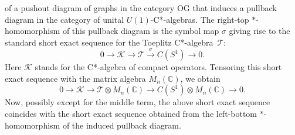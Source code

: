 \documentclass[12pt,times,a4paper]{amsart}
\numberwithin{equation}{section}
\numberwithin{equation}{section}
\begin{document}
of a pushout diagram of graphs in the category OG that induces a pullback diagram in the category of unital $U(1)$-C*-algebras.
The right-top $*$-homomorphism of this pullback diagram is the symbol map $\sigma$ giving rise to the standard
 short exact sequence for the Toeplitz C*-algebra~$\mathcal{T}$:
\begin{equation}
0\longrightarrow\mathcal{K}\longrightarrow\mathcal{T}\stackrel{\sigma}{\longrightarrow}C(S^1)\longrightarrow 0.
\end{equation}
Here $\mathcal{K}$ stands for the C*-algebra of compact operators. Tensoring this short exact sequence with the matrix algebra
$M_n(\mathbb{C})$, we obtain
\begin{equation}
0\longrightarrow\mathcal{K}\longrightarrow\mathcal{T}\otimes M_n(\mathbb{C})\stackrel{}{\longrightarrow}C(S^1)
\otimes M_n(\mathbb{C})\longrightarrow 0.
\end{equation}
Now, possibly except for the middle term, the above short exact sequence coincides with the short exact sequence obtained
from the left-bottom $*$-homomorphism of the induced pullback diagram.
\end{document}
